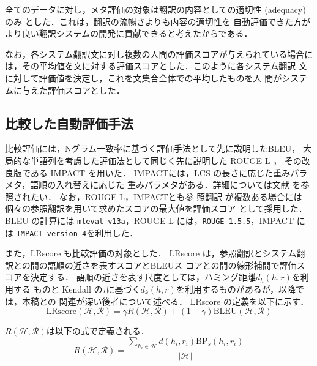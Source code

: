 \documentclass[japanese]{jnlp_1.4}
\begin{document}
全てのデータに対し，メタ評価の対象は翻訳の内容としての適切性 (adequacy) のみ
とした．これは，翻訳の流暢さよりも内容の適切性を
自動評価できた方がより良い翻訳システムの開発に貢献できると考えたからである．

なお，各システム翻訳文に対し複数の人間の評価スコアが与えられている場合に
は，その平均値を文に対する評価スコアとした．このように各システム翻訳
文に対して評価値を決定し，これを文集合全体での平均したものを人
間がシステムに与えた評価スコアとした．


\subsection{比較した自動評価手法}

比較評価には，Nグラム一致率に基づく評価手法として先に説明したBLEU，
大局的な単語列を考慮した評価法として同じく先に説明した
ROUGE-L \cite{ROUGEL}，
その改良版である IMPACT \cite{impact}を用いた．
IMPACTには，LCS の長さに応じた重みパラメタ，語順の入れ替えに応じた
重みパラメタがある．詳細については文献 \cite{impact} を参照されたい．
なお，ROUGE-L，IMPACTとも参
照翻訳
が複数ある場合には個々の参照翻訳を用いて求めたスコアの最大値を評価スコア
として採用した．BLEU の計算には {\tt mteval-v13a}，ROUGE-L 
には，\texttt{ROUGE-1.5.5}，IMPACT には \texttt{IMPACT version 4}を利用した．

また，LRscore \cite{birch,birch-wmt2010,birch-acl}も比較評価の対象とした．
LRscore は，参照翻訳とシステム翻訳との間の語順の近さを表すスコアとBLEUス
コアとの間の線形補間で評価スコアを決定する．
語順の近さを表す尺度としては，ハミング距離$d_h(h,r)$を利用する
ものと Kendall の$\tau$に基づく$d_k(h,r)$を利用するものがあるが，以降で
は，本稿との
関連が深い後者について述べる．
LRscore の定義を以下に示す．
\begin{equation}
 \mbox{LRscore}(\mathcal{H},\mathcal{R})=\gamma R(\mathcal{H},\mathcal{R})+(1-\gamma)\mbox{BLEU}(\mathcal{H},\mathcal{R})
\end{equation}

$R({\mathcal H},{\mathcal R})$は以下の式で定義される．
\begin{equation}
 R(\mathcal{H},\mathcal{R})=\frac{\displaystyle\mathop\sum_{h_i \in \mathcal{H}} d(h_i,r_i)\mbox{BP}_s(h_i,r_i)}{|\mathcal{H}|}
\end{equation}
\end{document}
